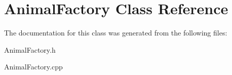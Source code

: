\hypertarget{class_animal_factory}{}\section{Animal\+Factory Class Reference}
\label{class_animal_factory}


The documentation for this class was generated from the following files\+:\begin{DoxyCompactItemize}
\item 
Animal\+Factory.\+h\item 
Animal\+Factory.\+cpp\end{DoxyCompactItemize}
